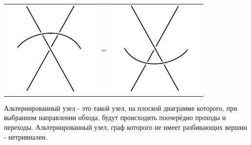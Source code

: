 \begin{tabular}{
>{\centering\arraybackslash}m{3cm}>{\centering\arraybackslash}m{0.4cm}
>{\centering\arraybackslash}m{3cm}
}
\includegraphics{images/over-cross-top.pdf}
&
=
&
\includegraphics{images/over-cross-bottom.pdf}

\end{tabular}

Альтернированный узел - это такой узел, на плоской диаграмме которого, при выбранном направлении обхода, будут происходить поочерёдно проходы и переходы.
Альтернированный узел, граф которого не имеет разбивающих вершин - нетривиален.
